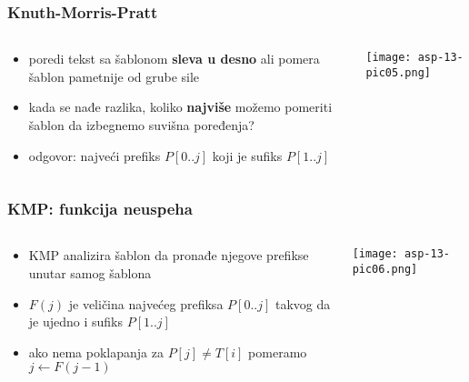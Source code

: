 \documentclass[compress,aspectratio=169]{beamer}
\begin{document}
\begin{frame}[fragile]
  \frametitle{Knuth-Morris-Pratt}
  \begin{columns}
    \begin{column}[t]{8cm}
      \begin{itemize}
        \item {} poredi tekst sa šablonom \textbf{sleva
        u desno} ali pomera šablon pametnije od grube sile
        \item kada se nađe razlika, koliko \textbf{najviše} možemo pomeriti
        šablon da izbegnemo suvišna poređenja?
        \item odgovor: najveći prefiks $P[0..j]$ koji je sufiks $P[1..j]$
      \end{itemize}
    \end{column}
    \begin{column}[t]{8cm}
      \begin{center}
        \texttt{[image: asp-13-pic05.png]}
      \end{center}
    \end{column}
  \end{columns}
\end{frame}

\begin{frame}[fragile]
  \frametitle{KMP: funkcija neuspeha}
  \begin{columns}
    \begin{column}[t]{8cm}
      \begin{itemize}
        \item KMP analizira šablon da pronađe njegove prefikse unutar samog
        šablona
        \item {} $F(j)$ je veličina najvećeg prefiksa
        $P[0..j]$ takvog da je ujedno i sufiks $P[1..j]$
        \item ako nema poklapanja za $P[j] \neq T[i]$ pomeramo
        $j \leftarrow F(j-1)$
      \end{itemize}
    \end{column}
    \begin{column}[t]{8cm}
      \begin{center}
        \texttt{[image: asp-13-pic06.png]}
      \end{center}
    \end{column}
  \end{columns}
\end{frame}
\end{document}
